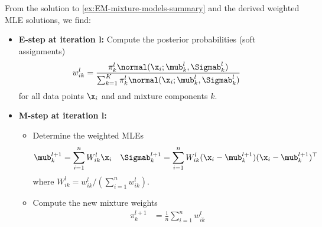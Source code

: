 \begin{exenumerate}
    \begin{solution}
      From the solution to \ref{ex:EM-mixture-models-summary} and the derived
      weighted MLE solutions, we find:
      \begin{itemize}
      \item \textbf{E-step at iteration l:} Compute the posterior probabilities (soft assignments)
        \begin{align}
          w_{ik}^l & =  \frac{ \pi^l_k \normal(\x_i; \mub^l_k, \Sigmab_k^l)}{ \sum_{k=1}^K\pi^l_k \normal(\x_i; \mub^l_k, \Sigmab_k^l) } 
      \end{align}
      for all data points $\x_i$ and and mixture components $k$.
    \item  \textbf{M-step at iteration l:}
      \begin{itemize}
      \item Determine the weighted MLEs
        \begin{align}
          \mub_k^{l+1} & =   \sum_{i=1}^n W^l_{ik}\x_i&  \Sigmab_k^{l+1} &=    \sum_{i=1}^n W^l_{ik} (\x_i- \mub_k^{l+1})(\x_i- \mub_k^{l+1})^\top
        \end{align}
        where $W^l_{ik} = w_{ik}^l/(\sum_{i=1}^n w_{ik}^l)$.
      \item Compute the new mixture weights
      \begin{align}
        \pi_k^{l+1} &=  \frac{1}{n}\sum_{i=1}^n w_{ik}^l
      \end{align}
    \end{itemize}
  \end{itemize}
  
      
    \end{solution}
      
\end{exenumerate}
 